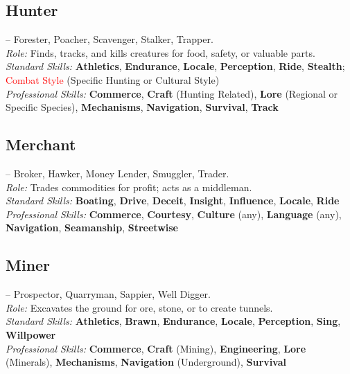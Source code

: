 \documentclass[10pt]{article}
\newcommand{\skill}[1]{\textbf{#1}}
\begin{document}
\vspace{0.2cm}
\subsection*{Hunter}
\label{career:hunter}
 -- Forester, Poacher, Scavenger, Stalker, Trapper.\\
\textit{Role:} Finds, tracks, and kills creatures for food, safety, or valuable parts.\\
\textit{Standard Skills:} \skill{Athletics}, \skill{Endurance}, \skill{Locale}, \skill{Perception}, \skill{Ride}, \skill{Stealth}; \textcolor{red}{Combat Style} (Specific Hunting or Cultural Style)\\
\textit{Professional Skills:} \skill{Commerce}, \skill{Craft} (Hunting Related), \skill{Lore} (Regional or Specific Species), \skill{Mechanisms}, \skill{Navigation}, \skill{Survival}, \skill{Track}

\vspace{0.2cm}
\subsection*{Merchant}
\label{career:merchant}
 -- Broker, Hawker, Money Lender, Smuggler, Trader.\\
\textit{Role:} Trades commodities for profit; acts as a middleman.\\
\textit{Standard Skills:} \skill{Boating}, \skill{Drive}, \skill{Deceit}, \skill{Insight}, \skill{Influence}, \skill{Locale}, \skill{Ride}\\
\textit{Professional Skills:} \skill{Commerce}, \skill{Courtesy}, \skill{Culture} (any), \skill{Language} (any), \skill{Navigation}, \skill{Seamanship}, \skill{Streetwise}

\vspace{0.2cm}
\subsection*{Miner}
\label{career:miner}
 -- Prospector, Quarryman, Sappier, Well Digger.\\
\textit{Role:} Excavates the ground for ore, stone, or to create tunnels.\\
\textit{Standard Skills:} \skill{Athletics}, \skill{Brawn}, \skill{Endurance}, \skill{Locale}, \skill{Perception}, \skill{Sing}, \skill{Willpower}\\
\textit{Professional Skills:} \skill{Commerce}, \skill{Craft} (Mining), \skill{Engineering}, \skill{Lore} (Minerals), \skill{Mechanisms}, \skill{Navigation} (Underground), \skill{Survival}
\end{document}
